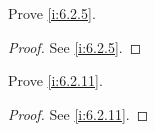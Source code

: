 \exercisesection

\begin{ex}\label{i:ex:6.2.1}
  Prove \cref{i:6.2.5}.
\end{ex}

\begin{proof}
  See \cref{i:6.2.5}.
\end{proof}

\begin{ex}\label{i:ex:6.2.2}
  Prove \cref{i:6.2.11}.
\end{ex}

\begin{proof}
  See \cref{i:6.2.11}.
\end{proof}

